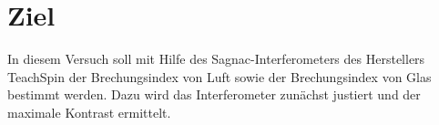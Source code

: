 \section{Ziel}
\label{sec:Ziel}
In diesem Versuch soll mit Hilfe des Sagnac-Interferometers des Herstellers TeachSpin
der Brechungsindex von Luft sowie der Brechungsindex von Glas bestimmt werden. Dazu wird das Interferometer
zunächst justiert und der maximale Kontrast ermittelt. 
